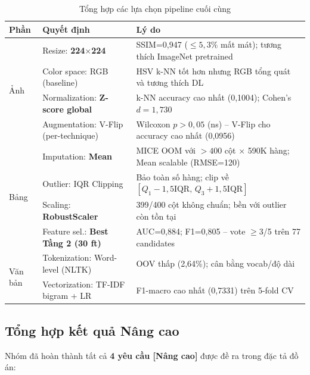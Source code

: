 \documentclass[12pt,a4paper]{article}
\let\oldtextbf\textbf
\renewcommand{\textbf}[1]{\oldtextbf{\textcolor{hcmublue}{#1}}}
\begin{document}
\begin{table}[H]
\centering
\begin{tabular}{|l|l|l|}
\hline
\textbf{Phần} & \textbf{Quyết định} & \textbf{Lý do} \\ \hline
\multirow{4}{*}{Ảnh}  & Resize: \textbf{224$\times$224} & SSIM=0{,}947 ($\leq 5{,}3\%$ mất mát); tương thích ImageNet pretrained \\ \cline{2-3}
                      & Color space: RGB (baseline) & HSV k-NN tốt hơn nhưng RGB tổng quát và tương thích DL \\ \cline{2-3}
                      & Normalization: \textbf{Z-score global} & k-NN accuracy cao nhất (0{,}1004); Cohen's $d = 1{,}730$ \\ \cline{2-3}
                      & Augmentation: V-Flip (per-technique) & Wilcoxon $p > 0{,}05$ (ns) -- V-Flip cho accuracy cao nhất (0{,}0956) \\ \hline
\multirow{4}{*}{Bảng} & Imputation: \textbf{Mean} & MICE OOM với $>400$ cột $\times$ 590K hàng; Mean scalable (RMSE=120) \\ \cline{2-3}
                      & Outlier: IQR Clipping & Bảo toàn số hàng; clip về $[Q_1\!-\!1{,}5\text{IQR},\, Q_3\!+\!1{,}5\text{IQR}]$ \\ \cline{2-3}
                      & Scaling: \textbf{RobustScaler} & 399/400 cột không chuẩn; bền với outlier còn tồn tại \\ \cline{2-3}
                      & Feature sel.: \textbf{Best Tầng 2 (30 ft)} & AUC=0{,}884; F1=0{,}805 -- vote $\geq$3/5 trên 77 candidates \\ \hline
\multirow{2}{*}{Văn bản} & Tokenization: Word-level (NLTK) & OOV thấp (2{,}64\%); cân bằng vocab/độ dài \\ \cline{2-3}
                         & Vectorization: TF-IDF bigram + LR & F1-macro cao nhất (0{,}7331) trên 5-fold CV \\ \hline
\end{tabular}
\caption{Tổng hợp các lựa chọn pipeline cuối cùng}
\label{tab:pipeline_summary}
\end{table}

\subsection{Tổng hợp kết quả Nâng cao}

Nhóm đã hoàn thành tất cả \textbf{4 yêu cầu [Nâng cao]} được đề ra trong đặc tả đồ án:
\end{document}
